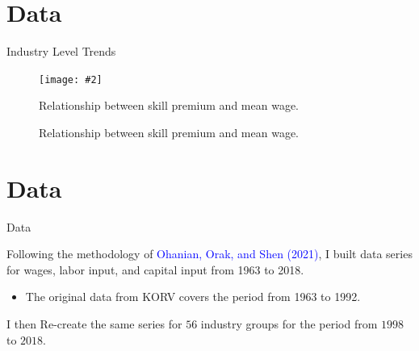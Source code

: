 \documentclass[notes,11pt, aspectratio=169]{beamer}
\makeatletter
\newcommand{\fitimage}[2][\@nil]{
 \begin{figure}
 \begin{adjustbox}{width=0.9\textwidth, totalheight=\textheight-2\baselineskip-2\baselineskip,keepaspectratio}
 \texttt{[image: \#2]}
 \end{adjustbox}
 \def\tmp{#1}%
 \ifx\tmp\@nnil
 \else
 \caption{#1}
 \fi
 \end{figure}
}
\newenvironment{wideitemize}{\itemize\addtolength{\itemsep}{10pt}}{\enditemize}
\makeatother
\begin{document}
\section*{Data}

\begin{frame}{Industry Level Trends}
 \begin{center}
 \fitimage[Relationship between skill premium and mean wage.]{../images/correlations_wage_SP_slides.pdf}
 \end{center}
\end{frame}



\section*{Data}
\begin{frame}{Data}
 \begin{wideitemize}
 \item Following the methodology of \textcolor{blue}{Ohanian, Orak, and Shen (2021)}, I built data series for wages, labor input, and capital input from 1963 to 2018.
 \begin{itemize}
 \item The original data from KORV covers the period from 1963 to 1992.
 \end{itemize}
 \item I then Re-create the same series for $56$ industry groups for the period from $1998$ to $2018$.
 \end{wideitemize}
 \end{frame}
 
\end{document}

